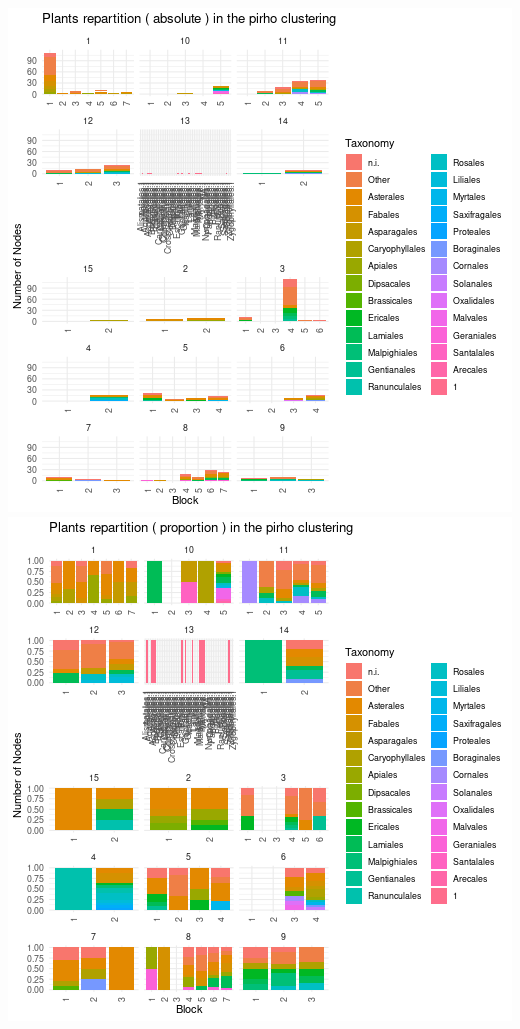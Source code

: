 \includegraphics{./img/9e913a77139e5e0a619c6c0e9beef79f87c6bb61.png}\includegraphics{./img/c3c10578cbfaf01a313454190bda1efad0227b03.png}
